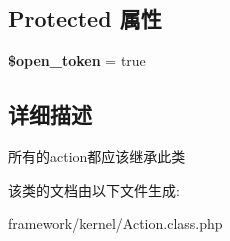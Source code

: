 \subsection*{Protected 属性}
\begin{DoxyCompactItemize}
\item 
\hypertarget{classAction_a605a5c8f27fefd824144f7b7a45c6e96}{{\bfseries \$open\+\_\+token} = true}\label{classAction_a605a5c8f27fefd824144f7b7a45c6e96}

\end{DoxyCompactItemize}


\subsection{详细描述}
所有的action都应该继承此类 

该类的文档由以下文件生成\+:\begin{DoxyCompactItemize}
\item 
framework/kernel/Action.\+class.\+php\end{DoxyCompactItemize}
